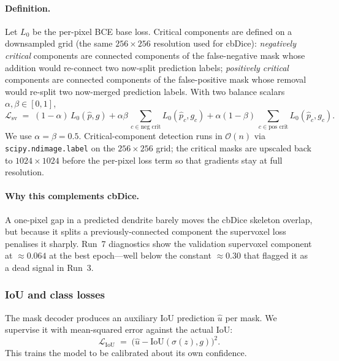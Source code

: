 \documentclass[11pt,a4paper]{article}
\begin{document}
\paragraph{Definition.} Let $L_0$ be the per-pixel BCE base loss.
Critical components are defined on a downsampled grid (the same
$256{\times}256$ resolution used for cbDice):
\emph{negatively critical} components are connected components of the
false-negative mask whose addition would re-connect two now-split
prediction labels; \emph{positively critical} components are
connected components of the false-positive mask whose removal would
re-split two now-merged prediction labels. With two balance scalars
$\alpha, \beta \in [0,1]$,
\begin{equation}
    \mathcal{L}_\text{sv} \;=\;
        (1{-}\alpha)\,L_0(\hat p, g)
      + \alpha\beta \,\sum_{c \in \text{neg crit}} L_0(\hat p_c, g_c)
      + \alpha(1{-}\beta) \,\sum_{c \in \text{pos crit}} L_0(\hat p_c, g_c).
\end{equation}
We use $\alpha{=}\beta{=}0.5$. Critical-component detection runs in
$\mathcal{O}(n)$ via \texttt{scipy.ndimage.label} on the
$256{\times}256$ grid; the critical masks are upscaled back to
$1024{\times}1024$ before the per-pixel loss term so that gradients
stay at full resolution.

\paragraph{Why this complements cbDice.} A one-pixel gap in a
predicted dendrite barely moves the cbDice skeleton overlap, but
because it splits a previously-connected component the supervoxel
loss penalises it sharply. Run~7 diagnostics show the validation
supervoxel component at $\approx 0.064$ at the best epoch---well
below the constant $\approx 0.30$ that flagged it as a dead signal
in Run~3.

\subsubsection{IoU and class losses}

The mask decoder produces an auxiliary IoU prediction $\hat{u}$ per mask.
We supervise it with mean-squared error against the actual IoU:
\begin{equation}
    \mathcal{L}_\text{IoU} \;=\; \bigl(\hat{u} - \mathrm{IoU}(\sigma(z), g)\bigr)^2.
\end{equation}
This trains the model to be calibrated about its own confidence.
\end{document}
